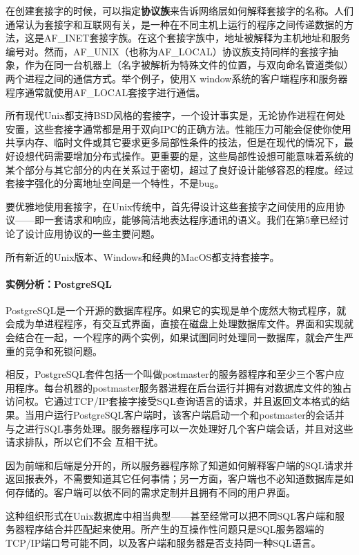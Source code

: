 \documentclass[12pt,oneside]{book}
\begin{document}
在创建套接字的时候，可以指定\textbf{协议族}来告诉网络层如何解释套接字的名称。人们通常认为套接字和互联网有关，是一种在不同主机上运行的程序之间传递数据的方法，这是AF\_{}INET套接字族。在这个套接字族中，地址被解释为主机地址和服务编号对。然而，AF\_{}UNIX（也称为AF\_{}LOCAL）协议族支持同样的套接字抽象，作为在同一台机器上（名字被解析为特殊文件的位置，与双向命名管道类似）两个进程之间的通信方式。举个例子，使用X window系统的客户端程序和服务器程序通常就使用AF\_{}LOCAL套接字进行通信。

所有现代Unix都支持BSD风格的套接字，一个设计事实是，无论协作进程在何处安置，这些套接字通常都是用于双向IPC的正确方法。性能压力可能会促使你使用共享内存、临时文件或其它要求更多局部性条件的技法，但是在现代的情况下，最好设想代码需要增加分布式操作。更重要的是，这些局部性设想可能意味着系统的某个部分与其它部分的内在关系过于密切，超过了良好设计能够容忍的程度。经过套接字强化的分离地址空间是一个特性，不是bug。

要优雅地使用套接字，在Unix传统中，首先得设计这些套接字之间使用的应用协议——即一套请求和响应，能够简洁地表达程序通讯的语义。我们在第5章已经讨论了设计应用协议的一些主要问题。

所有新近的Unix版本、Windows和经典的MacOS都支持套接字。


\paragraph{实例分析：PostgreSQL}
PostgreSQL是一个开源的数据库程序。如果它的实现是单个庞然大物式程序，就会成为单进程程序，有交互式界面，直接在磁盘上处理数据库文件。界面和实现就会结合在一起，一个程序的两个实例，如果试图同时处理同一数据库，就会产生严重的竞争和死锁问题。

相反，PostgreSQL套件包括一个叫做postmaster的服务器程序和至少三个客户应用程序。每台机器的postmaster服务器进程在后台运行并拥有对数据库文件的独占访问权。它通过TCP/IP套接字接受SQL查询语言的请求，并且返回文本格式的结果。当用户运行PostgreSQL客户端时，该客户端启动一个和postmaster的会话并与之进行SQL事务处理。服务器程序可以一次处理好几个客户端会话，并且对这些请求排队，所以它们不会
互相干扰。

因为前端和后端是分开的，所以服务器程序除了知道如何解释客户端的SQL请求并返回报表外，不需要知道其它任何事情；另一方面，客户端也不必知道数据库是如何存储的。客户端可以依不同的需求定制并且拥有不同的用户界面。

这种组织形式在Unix数据库中相当典型——甚至经常可以把不同SQL客户端和服务器程序结合并匹配起来使用。所产生的互操作性问题只是SQL服务器端的TCP/IP端口号可能不同，以及客户端和服务器是否支持同一种SQL语言。
\end{document}
